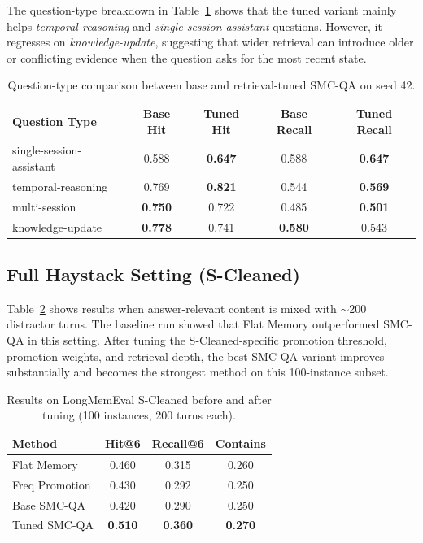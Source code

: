 \documentclass{article}
\begin{document}
The question-type breakdown in Table~\ref{tab:question-type} shows that the tuned variant mainly helps \textit{temporal-reasoning} and \textit{single-session-assistant} questions. However, it regresses on \textit{knowledge-update}, suggesting that wider retrieval can introduce older or conflicting evidence when the question asks for the most recent state.

\begin{table}[h]
\centering
\caption{Question-type comparison between base and retrieval-tuned SMC-QA on seed 42.}
\label{tab:question-type}
\begin{tabular}{lcccc}
\toprule
\textbf{Question Type} & \textbf{Base Hit} & \textbf{Tuned Hit} & \textbf{Base Recall} & \textbf{Tuned Recall} \\
\midrule
single-session-assistant & 0.588 & \textbf{0.647} & 0.588 & \textbf{0.647} \\
temporal-reasoning & 0.769 & \textbf{0.821} & 0.544 & \textbf{0.569} \\
multi-session & \textbf{0.750} & 0.722 & 0.485 & \textbf{0.501} \\
knowledge-update & \textbf{0.778} & 0.741 & \textbf{0.580} & 0.543 \\
\bottomrule
\end{tabular}
\end{table}

\subsection{Full Haystack Setting (S-Cleaned)}

Table~\ref{tab:scleaned} shows results when answer-relevant content is mixed with $\sim$200 distractor turns. The baseline run showed that Flat Memory outperformed SMC-QA in this setting. After tuning the S-Cleaned-specific promotion threshold, promotion weights, and retrieval depth, the best SMC-QA variant improves substantially and becomes the strongest method on this 100-instance subset.

\begin{table}[h]
\centering
\caption{Results on LongMemEval S-Cleaned before and after tuning (100 instances, 200 turns each).}
\label{tab:scleaned}
\begin{tabular}{lccc}
\toprule
\textbf{Method} & \textbf{Hit@6} & \textbf{Recall@6} & \textbf{Contains} \\
\midrule
Flat Memory & 0.460 & 0.315 & 0.260 \\
Freq Promotion & 0.430 & 0.292 & 0.250 \\
Base SMC-QA & 0.420 & 0.290 & 0.250 \\
Tuned SMC-QA & \textbf{0.510} & \textbf{0.360} & \textbf{0.270} \\
\bottomrule
\end{tabular}
\end{table}
\end{document}
